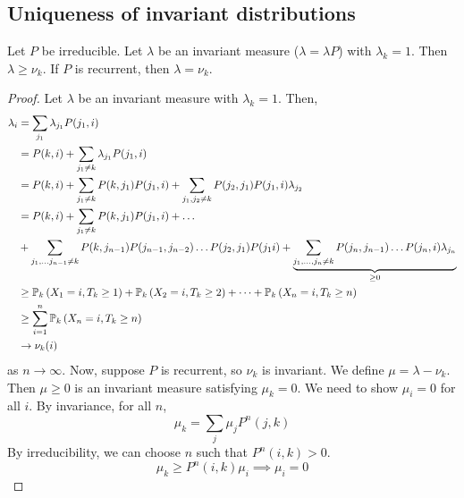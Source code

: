 \subsection{Uniqueness of invariant distributions}
\begin{theorem}
	Let \( P \) be irreducible.
	Let \( \lambda \) be an invariant measure (\( \lambda = \lambda P \)) with \( \lambda_k = 1 \).
	Then \( \lambda \geq \nu_k \).
	If \( P \) is recurrent, then \( \lambda = \nu_k \).
\end{theorem}
\begin{proof}
	Let \( \lambda \) be an invariant measure with \( \lambda_k = 1 \).
	Then,
	\begin{align*}
		\lambda_i & = \sum_{j_1} \lambda_{j_1} P(j_1, i)                                                                                                                                                               \\
		          & = P(k,i) + \sum_{j_1 \neq k} \lambda_{j_1} P(j_1, i)                                                                                                                                               \\
		          & = P(k,i) + \sum_{j_1 \neq k} P(k,j_1) P(j_1, i) + \sum_{j_1, j_2 \neq k} P(j_2, j_1) P(j_1, i) \lambda_{j_2}                                                                                       \\
		          & = P(k,i) + \sum_{j_1 \neq k} P(k,j_1) P(j_1, i) + \dots                                                                                                                                            \\
		          & + \sum_{j_1, \dots j_{n-1} \neq k} P(k,j_{n-1}) P(j_{n-1}, j_{n-2}) \dots P(j_2, j_1) P(j_1 i) + \underbrace{\sum_{j_1, \dots, j_n \neq k} P(j_n, j_{n-1}) \dots P(j_n, i) \lambda_{j_n}}_{\geq 0} \\
		          & \geq \mathbb{P}_{k}\left({X_1 = i, T_k \geq 1}\right) + \mathbb{P}_{k}\left({X_2 = i, T_k \geq 2}\right) + \dots + \mathbb{P}_{k}\left({X_n = i, T_k \geq n}\right)                                                                                         \\
		          & \geq \sum_{i=1}^n \mathbb{P}_{k}\left({X_n = i, T_k \geq n}\right)                                                                                                                                                    \\
		          & \to \nu_k(i)
	\end{align*}
	as \( n \to \infty \).
	Now, suppose \( P \) is recurrent, so \( \nu_k \) is invariant.
	We define \( \mu = \lambda - \nu_k \).
	Then \( \mu \geq 0 \) is an invariant measure satisfying \( \mu_k = 0 \).
	We need to show \( \mu_i = 0 \) for all \( i \).
	By invariance, for all \( n \),
	\[
		\mu_k = \sum_j \mu_j P^n(j,k)
	\]
	By irreducibility, we can choose \( n \) such that \( P^n(i,k) > 0 \).
	\[
		\mu_k \geq P^n(i,k) \mu_i \implies \mu_i = 0
	\]
\end{proof}
